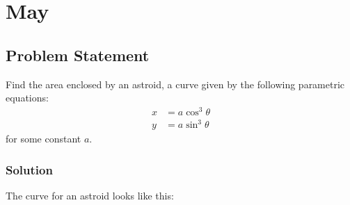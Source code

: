\documentclass[12pt]{article}
\begin{document}
\section{May}

\subsection{Problem Statement}

Find the area enclosed by an astroid, a curve given by the following parametric equations:
\begin{align}
  x &= a \cos^3 \theta \\
  y &= a \sin^3 \theta 
\end{align}
for some constant $a$.

\subsubsection*{Solution}

The curve for an astroid looks like this:

\vspace{.5cm}
\end{document}
